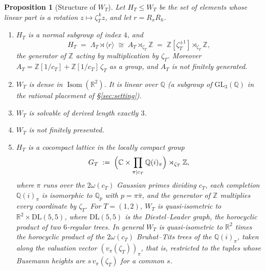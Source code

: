 \documentclass[11pt]{article}
\theoremstyle{plain}
\newtheorem{proposition}[theorem]{Proposition}
\theoremstyle{definition}
\theoremstyle{remark}
\newcommand{\Z}{\mathbb{Z}}
\newcommand{\Q}{\mathbb{Q}}
\newcommand{\R}{\mathbb{R}}
\newcommand{\C}{\mathbb{C}}
\DeclareMathOperator{\Isom}{Isom}
\begin{document}
\begin{proposition}[Structure of $W_T$]
\label{prop:WT-structure}
Let $H_T\le W_T$ be the set of elements whose linear part is a rotation
$z\mapsto\zeta_T^{\,k}z$, and let $r=R_xR_h$.
\begin{enumerate}[label=\textup{(\roman*)},itemsep=0.2em]
\item $H_T$ is a normal subgroup of index $4$, and
\[
  H_T \;=\; \Lambda_T\rtimes\langle r\rangle \;\cong\; A_T\rtimes_{\zeta_T}\Z
  \;=\; \Z[\zeta_T^{\pm1}]\rtimes_{\zeta_T}\Z ,
\]
the generator of $\Z$ acting by multiplication by $\zeta_T$. Moreover
$A_T=\Z[1/c_T]+\Z[1/c_T]\,\zeta_T$ as a group, and $A_T$ is not finitely generated.
\item $W_T$ is dense in $\Isom(\R^2)$. It is linear over $\Q$ (a subgroup of
$\mathrm{GL}_3(\Q)$ in the rational placement of \S\ref{sec:setting}).
\item $W_T$ is solvable of derived length exactly $3$.
\item $W_T$ is not finitely presented.
\item $H_T$ is a cocompact lattice in the locally compact group
\[
  G_T \;:=\; \Bigl(\C\times\prod_{\pi\mid c_T}\Q(i)_\pi\Bigr)\rtimes_{\zeta_T}\Z ,
\]
where $\pi$ runs over the $2\omega(c_T)$ Gaussian primes dividing $c_T$, each
completion $\Q(i)_\pi$ is isomorphic to $\Q_p$ with $p=\pi\bar\pi$, and the
generator of $\Z$ multiplies every coordinate by $\zeta_T$. For $T=(1,2)$,
$W_T$ is quasi-isometric to $\R^2\times\mathrm{DL}(5,5)$, where $\mathrm{DL}(5,5)$
is the Diestel--Leader graph, the horocyclic product of two $6$-regular trees.
In general $W_T$ is quasi-isometric to $\R^2$ times the horocyclic product of
the $2\omega(c_T)$ Bruhat--Tits trees of the $\Q(i)_\pi$, taken along the
valuation vector $(v_\pi(\zeta_T))_\pi$, that is, restricted to the tuples whose
Busemann heights are $s\,v_\pi(\zeta_T)$ for a common $s$.
\end{enumerate}
\end{proposition}
\end{document}
